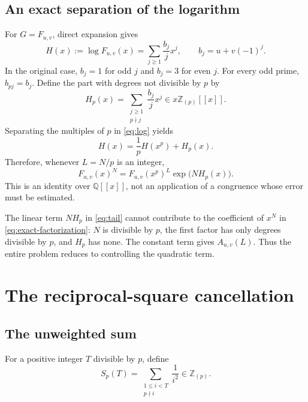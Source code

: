 \documentclass[11pt,a4paper]{article}
\numberwithin{equation}{section}
\theoremstyle{definition}
\theoremstyle{remark}
\newcommand{\Z}{\mathbb Z}
\newcommand{\Q}{\mathbb Q}
\newcommand{\Zp}{\Z_{(p)}}
\newcommand{\Auv}{A_{u,v}}
\newcommand{\Fp}{F_{u,v}}
\newcommand{\Sp}{S_p}
\newcommand{\Hp}{H_p}
\begin{document}
\subsection{An exact separation of the logarithm}

For $G=\Fp$, direct expansion gives
\begin{equation}\label{eq:log}
 H(x):=\log\Fp(x)=\sum_{j\geq1}\frac{b_j}{j}x^j,
 \qquad b_j=u+v(-1)^j.
\end{equation}
In the original case, $b_j=1$ for odd $j$ and $b_j=3$ for even $j$.
For every odd prime, $b_{pj}=b_j$. Define the part with degrees not
divisible by $p$ by
\begin{equation}\label{eq:Hp}
 \Hp(x)=\sum_{\substack{j\geq1\\p\nmid j}}\frac{b_j}{j}x^j
 \in x\Zp[[x]].
\end{equation}
Separating the multiples of $p$ in \eqref{eq:log} yields
\begin{equation}\label{eq:logsplit}
 H(x)=\frac1pH(x^p)+\Hp(x).
\end{equation}
Therefore, whenever $L=N/p$ is an integer,
\begin{equation}\label{eq:exact-factorization}
 \Fp(x)^N=\Fp(x^p)^L\exp\bigl(N\Hp(x)\bigr).
\end{equation}
This is an identity over $\Q[[x]]$, not an application of a congruence
whose error must be estimated.

The linear term $N\Hp$ in \eqref{eq:tail} cannot contribute to the
coefficient of $x^N$ in \eqref{eq:exact-factorization}: $N$ is divisible
by $p$, the first factor has only degrees divisible by $p$, and $\Hp$
has none. The constant term gives $\Auv(L)$. Thus the entire problem
reduces to controlling the quadratic term.

\section{The reciprocal-square cancellation}\label{sec:harmonic}

\subsection{The unweighted sum}

For a positive integer $T$ divisible by $p$, define
\begin{equation}\label{eq:S}
 \Sp(T)=\sum_{\substack{1\leq i<T\\p\nmid i}}\frac1{i^2}\in\Zp.
\end{equation}
\end{document}
